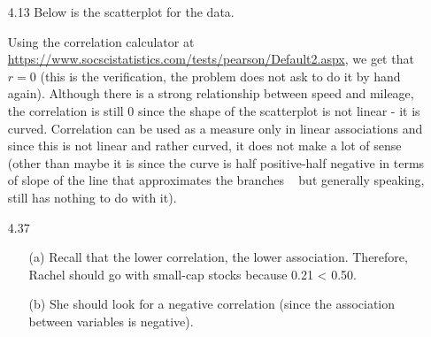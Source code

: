 \documentclass[11pt, a4paper]{article}
\begin{document}
\begin{itemize}
\item[]
\item[]

\item[4.13]
Below is the scatterplot for the data.

\item[]
\item[]
\begin{center}
\end{center}
\item[]
\item[]
Using the correlation calculator at \url{https://www.socscistatistics.com/tests/pearson/Default2.aspx},
we get that $r = 0$ (this is the verification, the problem does not
ask to do it by hand again). Although there is a strong relationship
between speed and mileage, the correlation is still 0 since the
shape of the scatterplot is not linear - it is curved. Correlation
can be used as a measure only in linear associations and since this
is not linear and rather curved, it does not make a lot of sense (other than maybe it is since the curve is half positive-half negative in terms
of slope of the line that approximates the branches ~ but generally speaking, still has nothing to do with it).

\item[]
\item[]

\item[4.37]
\begin{itemize}
\item[(a)]
Recall that the lower correlation, the lower association.
Therefore, Rachel should go with small-cap stocks because 0.21 < 0.50.

\item[]

\item[(b)]
She should look for a negative correlation (since the association between variables is negative).
\end{itemize}

\item[]
\item[]


\end{itemize}
\end{document}
